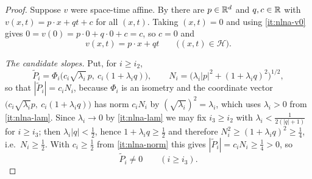 \begin{proof}
Suppose $v$ were space-time affine. By  there are
$p\in\mathbb{R}^d$ and $q,c\in\mathbb{R}$ with $v(x,t)=p\cdot x+qt+c$ for all $(x,t)$. Taking
$(x,t)=0$ and using \ref{it:nlna-v0} gives $0=v(0)=p\cdot0+q\cdot0+c=c$, so
$c=0$ and
\begin{equation}\label{eq:nlna-aff}
  v(x,t)=p\cdot x+qt\qquad\bigl((x,t)\in\mathcal H\bigr).
\end{equation}

\emph{The candidate slopes.} Put, for $i\ge i_2$,
\[
  \widetilde P_i=\Phi_i\bigl(c_i\sqrt{\lambda_i}\,p,\ c_i(1+\lambda_iq)\bigr),
  \qquad N_i=\bigl(\lambda_i|p|^2+(1+\lambda_iq)^2\bigr)^{1/2},
\]
so that $|\widetilde P_i|=c_iN_i$, because $\Phi_i$ is an isometry and the
coordinate vector $\bigl(c_i\sqrt{\lambda_i}p,\ c_i(1+\lambda_iq)\bigr)$ has norm
$c_iN_i$ by $(\sqrt{\lambda_i})^2=\lambda_i$, which uses $\lambda_i>0$ from
\ref{it:nlna-lam}. Since $\lambda_i\to0$ by \ref{it:nlna-lam} we may fix
$i_3\ge i_2$ with $\lambda_i<\tfrac1{2(|q|+1)}$ for $i\ge i_3$; then
$\lambda_i|q|<\tfrac12$, hence $1+\lambda_iq\ge\tfrac12$ and therefore
$N_i^2\ge(1+\lambda_iq)^2\ge\tfrac14$, i.e.\ $N_i\ge\tfrac12$. With
$c_i\ge\tfrac12$ from \ref{it:nlna-norm} this gives
$|\widetilde P_i|=c_iN_i\ge\tfrac14>0$, so
\begin{equation}\label{eq:nlna-Pne}
  \widetilde P_i\ne0\qquad(i\ge i_3).
\end{equation}


\end{proof}
